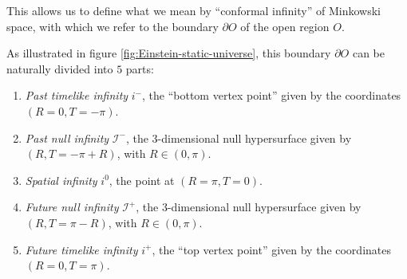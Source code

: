 This allows us to define what we mean by ``conformal infinity'' of Minkowski space, with which we refer to the boundary \(\partial O\) of the open region \(O\).


As illustrated in figure \ref{fig:Einstein-static-universe}, this boundary \(\partial O\) can be naturally divided into \(5\) parts:
\begin{enumerate}[label=(\arabic*)]
	\item \emph{Past timelike infinity} \(i^{-}\), the ``bottom vertex point'' given by the coordinates \((R = 0, T = -\pi)\).
	\item \emph{Past null infinity} \(\mathscr{I}^-\), the \(3\)-dimensional null hypersurface given by \((R, T = -\pi + R)\), with \(R \in (0, \pi)\).
	\item \emph{Spatial infinity} \(i^0\), the point at \((R=\pi, T = 0)\).
	\item \emph{Future null infinity} \(\mathscr{I}^+\), the \(3\)-dimensional null hypersurface given by \((R, T = \pi - R)\), with \(R \in (0, \pi)\).
	\item \emph{Future timelike infinity} \(i^{+}\), the ``top vertex point'' given by the coordinates \((R = 0, T = \pi)\).
\end{enumerate}

